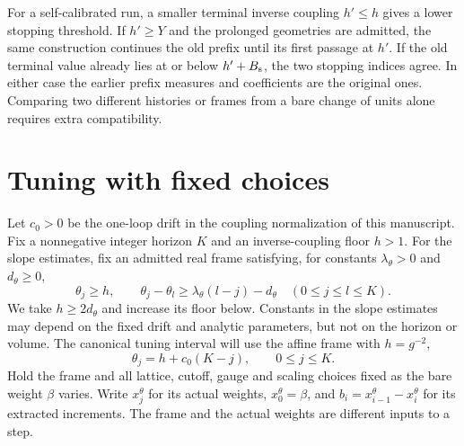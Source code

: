 \documentclass[11pt,letterpaper,reqno]{amsart}
\numberwithin{equation}{section}
\theoremstyle{definition}
\theoremstyle{remark}
\begin{document}
For a self-calibrated run, a smaller terminal inverse
coupling \(h'\le h\) gives a lower stopping threshold.
If \(h'\ge Y\) and the prolonged geometries are admitted,
the same construction continues the old prefix until its
first passage at \(h'\). If the old terminal value already
lies at or below \(h'+B_{\rm s}\), the two stopping indices
agree. In either case the earlier prefix measures and
coefficients are the original ones. Comparing two different
histories or frames from a bare change of units alone
requires extra compatibility.

\section{Tuning with fixed choices}
\label{rt:sec-frozen-tuning}

Let $c_0>0$ be the one-loop drift in the coupling normalization of
this manuscript. Fix a nonnegative integer horizon $K$ and an
inverse-coupling floor $h>1$. For the slope estimates, fix an admitted
real frame satisfying, for constants $\lambda_\theta>0$ and $d_\theta\ge0$,
\begin{equation}\label{rt:eq-frozen-frame-drift}
  \theta_j\ge h,\qquad
  \theta_j-\theta_l\ge\lambda_\theta(l-j)-d_\theta
                  \quad(0\le j\le l\le K).
\end{equation}
We take $h\ge2d_\theta$ and increase its floor below. Constants
in the slope estimates may depend on the fixed drift and analytic
parameters, but not on the horizon or volume. The canonical
tuning interval will use the affine frame with $h=g^{-2}$,
\begin{equation}\label{rt:eq-frozen-frame}
       \theta_j=h+c_0(K-j),\qquad 0\le j\le K.
\end{equation}
Hold the frame and all lattice, cutoff, gauge and scaling choices
fixed as the bare weight $\beta$ varies. Write $x_j^\theta$ for
its actual weights, $x_0^\theta=\beta$, and
$b_i=x_{i-1}^\theta-x_i^\theta$ for its extracted increments. The
frame and the actual weights are different inputs to a step.
\end{document}
